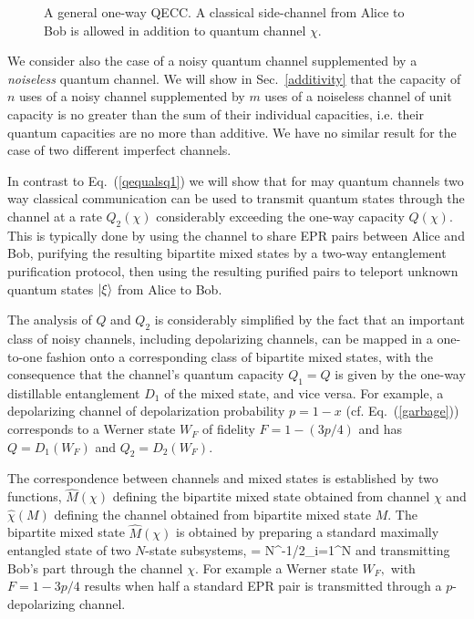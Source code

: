 \begin{figure}[htbp]
\centerline{}
\caption[General $Q_1$ style EPP]
{A general one-way QECC.  A classical side-channel from Alice
to Bob is allowed in addition to quantum channel $\chi$.}
\label{epp16}
\end{figure}

We consider also the case of a noisy quantum channel supplemented
by a {\em noiseless} quantum channel.  We will show 
in Sec.~\ref{additivity} that the capacity of $n$ uses of a
noisy channel supplemented by $m$ uses of a noiseless channel
of unit capacity is no greater than the sum of their
individual capacities, i.e. their quantum capacities are no 
more than additive.  We have no similar result for the case of 
two different imperfect channels.
 
In contrast to Eq.~(\ref{qequalsq1}) we will show that for may quantum 
channels two way
classical communication can be used to transmit quantum states through
the channel at a rate $Q_2(\chi)$ considerably exceeding the one-way capacity
$Q(\chi)$.  This is typically done by using the channel to share
EPR pairs between Alice and Bob, purifying the resulting
bipartite mixed states by a two-way entanglement purification protocol,
then using the resulting purified pairs to teleport
unknown quantum states $| \xi \rangle$ from Alice to Bob.
 
The analysis of $Q$ and $Q_2$ is considerably simplified by the fact that
an important class of noisy channels, including depolarizing
channels, can be mapped in a one-to-one fashion onto a corresponding
class of bipartite mixed states, with the consequence that the channel's
quantum capacity $Q_1=Q$ is given by the one-way distillable
entanglement $D_1$ of the mixed state, and vice versa. For example, a
depolarizing channel of depolarization probability $p=1-x$
(cf. Eq.~(\ref{garbage})) corresponds to a
Werner state $W_F$ of fidelity $F=1-(3p/4)$ and has $Q=D_1(W_F)$ and
$Q_2=D_2(W_F)$.
 
The correspondence between channels and mixed states is established by
two functions, $\hat{M}(\chi)$ defining the bipartite mixed state
obtained from channel $\chi$ and $\hat{\chi}(M)$ defining the channel
obtained from bipartite mixed state $M$. 
The bipartite mixed state $\hat{M}(\chi)$ is
obtained by preparing a standard maximally entangled state of two
$N$-state subsystems,
 \beq \Upsilon = N^{-1/2}\sum_{i=1}^N
\otimes{}
 \eeq  and transmitting Bob's part
through the channel $\chi$. For example a Werner state $W_F,$ with
$F=1\!-\!3p/4$ results when half a standard EPR pair is transmitted through
a $p$-depolarizing channel. 
 
